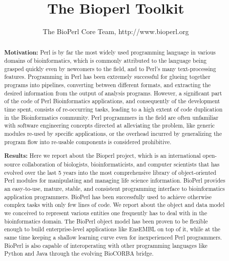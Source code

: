 \documentclass{article}
\begin{document}
\begin{twocolumn}
\title{The Bioperl Toolkit}
\author{The BioPerl Core Team, http://www.bioperl.org}
\maketitle

\begin{abstract}

\textbf{Motivation:} Perl is by far the most widely used programming
language in various domains of bioinformatics, which is commonly
attributed to the language being grasped quickly even by newcomers to
the field, and to Perl's many text-processing features.  Programming in
Perl has been extremely successful for glueing together programs into
pipelines, converting between different formats, and extracting the
desired information from the output of analysis programs.  However, a
significant part of the code of Perl Bioinformatics applications, and
consequently of the development time spent, consists of re-occurring
tasks, leading to a high extent of code duplication in the
Bioinformatics community.  Perl programmers in the field are often
unfamiliar with software engineering concepts directed at alleviating
the problem, like generic modules re-used by specific applications, or
the overhead incurred by generalizing the program flow into re-usable
components is considered prohibitive.

\textbf{ Results:} Here we report about the Bioperl project, which is
an international open-source collaboration of biologists,
bioinformaticists, and computer scientists that has evolved over the
last 5 years into the most comprehensive library of object-oriented
Perl modules for manipulating and managing life science information.
BioPerl provides an easy-to-use, mature, stable, and consistent
programming interface to bioinformatics application programmers.
BioPerl has been successfully used to achieve otherwise complex tasks
with only few lines of code.  We report about the object and data
model we conceived to represent various entities one frequently has to
deal with in the bioinformatics domain.  The BioPerl object model has
been proven to be flexible enough to build enterprise-level
applications like EnsEMBL \cite{ensembl} on top of it, while at the
same time keeping a shallow learning curve even for inexperienced Perl
programmers.  BioPerl is also capable of interoperating with other
programming languages like Python and Java through the evolving
BioCORBA bridge.


\end{abstract}
\end{twocolumn}
\end{document}

